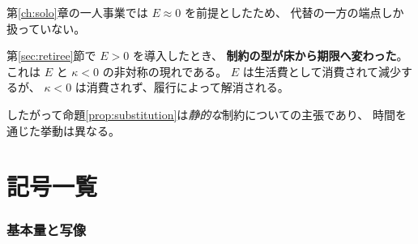 \begin{remark}[代替の限界が現れる場面]
\label{rem:substitution-boundary}
第\ref{ch:solo}章の一人事業では $E\approx 0$ を前提としたため、
代替の一方の端点しか扱っていない。

第\ref{sec:retiree}節で $E>0$ を導入したとき、
\textbf{制約の型が床から期限へ変わった}。
これは $E$ と $\kappa<0$ の非対称の現れである。
$E$ は生活費として消費されて減少するが、
$\kappa<0$ は消費されず、履行によって解消される。

したがって命題\ref{prop:substitution}は\emph{静的な}制約についての主張であり、
時間を通じた挙動は異なる。
\end{remark}

\chapter{記号一覧}
\label{app:notation}

\subsection*{基本量と写像}

